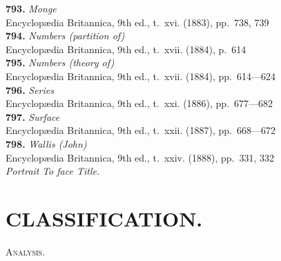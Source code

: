 \documentclass[12pt,a4paper,oneside]{book}
\begin{document}
\small
\noindent\textbf{793.} \textit{Monge} \\
\hspace*{2em}Encyclop\ae{}dia Britannica, 9th ed., t.~xvi. (1883), pp.~738, 739\\[0.4em]
\textbf{794.} \textit{Numbers (partition of)} \\
\hspace*{2em}Encyclop\ae{}dia Britannica, 9th ed., t.~xvii. (1884), p.~614\\[0.4em]
\textbf{795.} \textit{Numbers (theory of)} \\
\hspace*{2em}Encyclop\ae{}dia Britannica, 9th ed., t.~xvii. (1884), pp.~614---624\\[0.4em]
\textbf{796.} \textit{Series} \\
\hspace*{2em}Encyclop\ae{}dia Britannica, 9th ed., t.~xxi. (1886), pp.~677---682\\[0.4em]
\textbf{797.} \textit{Surface} \\
\hspace*{2em}Encyclop\ae{}dia Britannica, 9th ed., t.~xxii. (1887), pp.~668---672\\[0.4em]
\textbf{798.} \textit{Wallis (John)} \\
\hspace*{2em}Encyclop\ae{}dia Britannica, 9th ed., t.~xxiv. (1888), pp.~331, 332\\[0.4em]
\textit{Portrait} \dotfill \textit{To face Title.}

\clearpage

\fancyhf{}\fancyhead[R]{\textsc{\thepage}}

\thispagestyle{plain}
\chapter*{CLASSIFICATION.}

\noindent\textsc{Analysis.}
\end{document}
